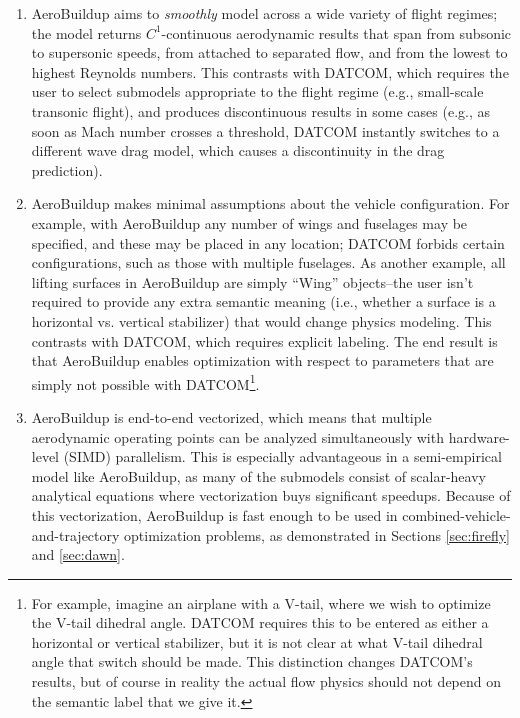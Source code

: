 \begin{enumerate}
    \item AeroBuildup aims to \emph{smoothly} model across a wide variety of flight regimes; the model returns $C^1$-continuous aerodynamic results that span from subsonic to supersonic speeds, from attached to separated flow, and from the lowest to highest Reynolds numbers. This contrasts with DATCOM, which requires the user to select submodels appropriate to the flight regime (e.g., small-scale transonic flight), and produces discontinuous results in some cases (e.g., as soon as Mach number crosses a threshold, DATCOM instantly switches to a different wave drag model, which causes a discontinuity in the drag prediction).

    \item AeroBuildup makes minimal assumptions about the vehicle configuration. For example, with AeroBuildup any number of wings and fuselages may be specified, and these may be placed in any location; DATCOM forbids certain configurations, such as those with multiple fuselages. As another example, all lifting surfaces in AeroBuildup are simply ``Wing'' objects--the user isn't required to provide any extra semantic meaning (i.e., whether a surface is a horizontal vs. vertical stabilizer) that would change physics modeling. This contrasts with DATCOM, which requires explicit labeling. The end result is that AeroBuildup enables optimization with respect to parameters that are simply not possible with DATCOM\footnote{For example, imagine an airplane with a V-tail, where we wish to optimize the V-tail dihedral angle. DATCOM requires this to be entered as either a horizontal or vertical stabilizer, but it is not clear at what V-tail dihedral angle that switch should be made. This distinction changes DATCOM's results, but of course in reality the actual flow physics should not depend on the semantic label that we give it.}.

    \item AeroBuildup is end-to-end vectorized, which means that multiple aerodynamic operating points can be analyzed simultaneously with hardware-level (SIMD) parallelism. This is especially advantageous in a semi-empirical model like AeroBuildup, as many of the submodels consist of scalar-heavy analytical equations where vectorization buys significant speedups. Because of this vectorization, AeroBuildup is fast enough to be used in combined-vehicle-and-trajectory optimization problems, as demonstrated in Sections \ref{sec:firefly} and \ref{sec:dawn}.


\end{enumerate}
